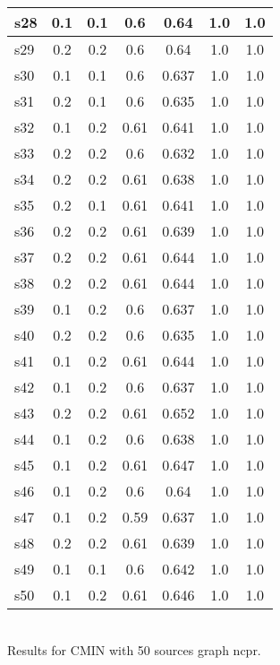 \documentclass{article}
\begin{document}
\begin{tabular}{|l|c|c|c|c|c|c|}
\hline
s28 &0.1 & 0.1 & 0.6 & 0.64 & 1.0 & 1.0\\
\hline
s29 &0.2 & 0.2 & 0.6 & 0.64 & 1.0 & 1.0\\
\hline
s30 &0.1 & 0.1 & 0.6 & 0.637 & 1.0 & 1.0\\
\hline
s31 &0.2 & 0.1 & 0.6 & 0.635 & 1.0 & 1.0\\
\hline
s32 &0.1 & 0.2 & 0.61 & 0.641 & 1.0 & 1.0\\
\hline
s33 &0.2 & 0.2 & 0.6 & 0.632 & 1.0 & 1.0\\
\hline
s34 &0.2 & 0.2 & 0.61 & 0.638 & 1.0 & 1.0\\
\hline
s35 &0.2 & 0.1 & 0.61 & 0.641 & 1.0 & 1.0\\
\hline
s36 &0.2 & 0.2 & 0.61 & 0.639 & 1.0 & 1.0\\
\hline
s37 &0.2 & 0.2 & 0.61 & 0.644 & 1.0 & 1.0\\
\hline
s38 &0.2 & 0.2 & 0.61 & 0.644 & 1.0 & 1.0\\
\hline
s39 &0.1 & 0.2 & 0.6 & 0.637 & 1.0 & 1.0\\
\hline
s40 &0.2 & 0.2 & 0.6 & 0.635 & 1.0 & 1.0\\
\hline
s41 &0.1 & 0.2 & 0.61 & 0.644 & 1.0 & 1.0\\
\hline
s42 &0.1 & 0.2 & 0.6 & 0.637 & 1.0 & 1.0\\
\hline
s43 &0.2 & 0.2 & 0.61 & 0.652 & 1.0 & 1.0\\
\hline
s44 &0.1 & 0.2 & 0.6 & 0.638 & 1.0 & 1.0\\
\hline
s45 &0.1 & 0.2 & 0.61 & 0.647 & 1.0 & 1.0\\
\hline
s46 &0.1 & 0.2 & 0.6 & 0.64 & 1.0 & 1.0\\
\hline
s47 &0.1 & 0.2 & 0.59 & 0.637 & 1.0 & 1.0\\
\hline
s48 &0.2 & 0.2 & 0.61 & 0.639 & 1.0 & 1.0\\
\hline
s49 &0.1 & 0.1 & 0.6 & 0.642 & 1.0 & 1.0\\
\hline
s50 &0.1 & 0.2 & 0.61 & 0.646 & 1.0 & 1.0\\
\hline
\end{tabular}\\

\noindent Results for CMIN with 50 sources graph ncpr.
\end{document}
